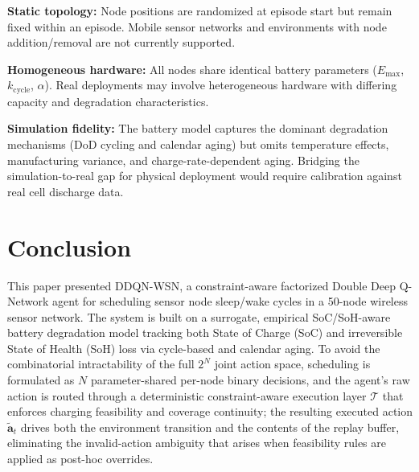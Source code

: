 \documentclass[journal]{IEEEtran}
\begin{document}
\textbf{Static topology:} Node positions are randomized at episode start but remain fixed within an episode. Mobile sensor networks and environments with node addition/removal are not currently supported.

\textbf{Homogeneous hardware:} All nodes share identical battery parameters ($E_{\max}$, $k_{\text{cycle}}$, $\alpha$). Real deployments may involve heterogeneous hardware with differing capacity and degradation characteristics.

\textbf{Simulation fidelity:} The battery model captures the dominant degradation mechanisms (DoD cycling and calendar aging) but omits temperature effects, manufacturing variance, and charge-rate-dependent aging. Bridging the simulation-to-real gap for physical deployment would require calibration against real cell discharge data.



\section{Conclusion}
\label{sec:conclusion}

This paper presented DDQN-WSN, a constraint-aware factorized Double
Deep Q-Network agent for scheduling sensor node sleep/wake cycles in a
50-node wireless sensor network. The system is built on a surrogate,
empirical SoC/SoH-aware battery degradation model tracking both State
of Charge (SoC) and irreversible State of Health (SoH) loss via
cycle-based and calendar aging. To avoid the combinatorial
intractability of the full $2^N$ joint action space, scheduling is
formulated as $N$ parameter-shared per-node binary decisions, and the
agent's raw action is routed through a deterministic constraint-aware
execution layer $\mathcal{T}$ that enforces charging feasibility and
coverage continuity; the resulting executed action
$\tilde{\mathbf{a}}_t$ drives both the environment transition and the
contents of the replay buffer, eliminating the invalid-action ambiguity
that arises when feasibility rules are applied as post-hoc overrides.
\end{document}
